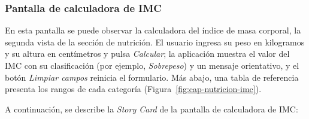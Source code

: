 \subsubsection{Pantalla de calculadora de IMC}

En esta pantalla se puede observar la calculadora del índice de masa corporal,
la segunda vista de la sección de nutrición. El usuario ingresa su peso en
kilogramos y su altura en centímetros y pulsa \emph{Calcular}; la aplicación
muestra el valor del IMC con su clasificación (por ejemplo, \emph{Sobrepeso}) y
un mensaje orientativo, y el botón \emph{Limpiar campos} reinicia el
formulario. Más abajo, una tabla de referencia presenta los rangos de cada
categoría (Figura~\ref{fig:cap-nutricion-imc}).


A continuación, se describe la \emph{Story Card} de la pantalla de calculadora de IMC:

